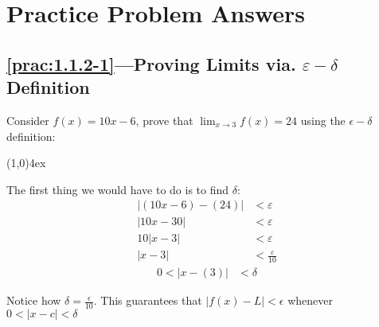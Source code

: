 \documentclass{MathNotes}
\newcommand{\br}{
\begin{center}
\line(1,0){4ex}
\end{center}}
\begin{document}

\newpage

\section{Practice Problem Answers}

\subsection*{\ref{prac:1.1.2-1}---Proving Limits via. $\varepsilon-\delta$ Definition}
\label{ans:1.1.2-1}
Consider $f(x)=10x-6$, prove that $\displaystyle\lim_{x\to 3}f(x)=24$ using the 
$\epsilon-\delta$ definition:
\br
The first thing we would have to do is to find $\delta$:
\begin{align*}
    \lvert (10x-6)-(24) \rvert &<\varepsilon  \\
    \lvert 10x-30 \rvert &<\varepsilon \\
    10\lvert x-3 \rvert &<\varepsilon \\
    \lvert x-3 \rvert &<\frac{\varepsilon}{10}
\end{align*}
\begin{align*}
    0 < \lvert x - (3)\rvert &< \delta
\end{align*}

Notice how $\delta=\frac{\epsilon}{10}$. This guarantees that
$\lvert f(x)-L \rvert < \epsilon$ whenever $0<\lvert x-c \rvert<\delta$
\end{document}

